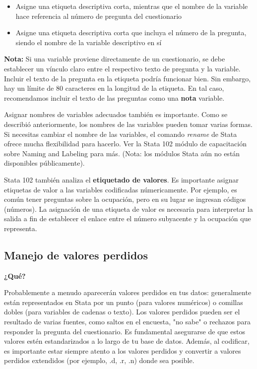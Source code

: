 \documentclass[11pt,en]{elegantpaper}
\begin{document}
\begin{itemize}
	\item Asigne una etiqueta descriptiva corta, mientras que el nombre de la variable hace referencia al número de pregunta del
	      cuestionario
	\item Asigne una etiqueta descriptiva corta que incluya el número de la pregunta, siendo el nombre de la variable
	      descriptivo en sí
\end{itemize}

\textbf{Nota:} Si una variable proviene directamente de un cuestionario, se debe establecer un vínculo claro entre el respectivo texto de pregunta y la variable. Incluir el texto de la pregunta en la etiqueta podría funcionar bien. Sin embargo, hay un límite de 80 caracteres en la longitud de la etiqueta. En tal caso, recomendamos incluir el texto de las preguntas como una \textbf{nota} variable.

Asignar nombres de variables adecuados también es importante. Como se describió anteriormente, los nombres de las variables pueden tomar varias formas. Si necesitas cambiar el nombre de las variables, el comando \textit{rename} de Stata ofrece mucha flexibilidad para hacerlo. Ver la Stata 102 módulo de capacitación sobre Naming and Labeling para más. (Nota: los módulos Stata aún no están disponibles públicamente).

Stata 102 también analiza el \textbf{etiquetado de valores}. Es importante asignar etiquetas de valor a las variables codificadas númericamente. Por ejemplo, es común tener preguntas sobre la ocupación, pero en su lugar se ingresan códigos (números). La asignación de una etiqueta de valor es necesaria para interpretar la salida a fin de establecer el enlace entre el número subyacente y la ocupación que representa.

\subsection{Manejo de valores perdidos}
\label{sec:missings}

\textbf{¿Qué?}

Probablemente a menudo aparecerán valores perdidos en tus datos: generalmente están representados en Stata por un punto (para valores numéricos) o comillas dobles (para variables de cadenas o texto). Los valores perdidos pueden ser el resultado de varias fuentes, como saltos en el encuesta, "no sabe" o rechazos para responder la pregunta del cuestionario. Es fundamental asegurarse de que estos valores estén estandarizados a lo largo de tu base de datos. Además, al codificar, es importante estar siempre atento a los valores perdidos y convertir a valores perdidos extendidos (por ejemplo, .d, .r, .n) donde sea posible.
\end{document}
